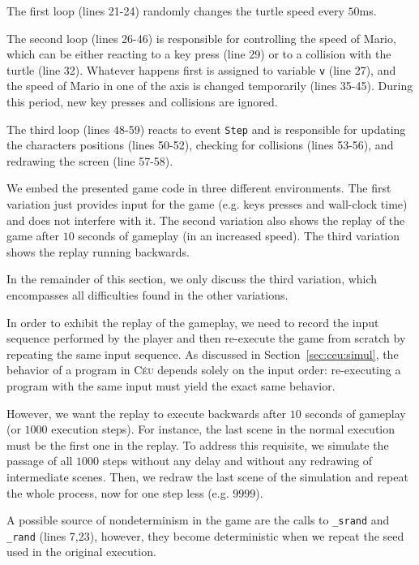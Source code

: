 \documentclass[11pt,a4paper]{article}
\newcommand{\2}{\;\;}
\newcommand{\5}{\;\;\;\;\;}
\newcommand{\CEU}{\textsc{C\'{e}u}}
\newcommand{\code}[1] {{\small{\texttt{#1}}}}
\begin{document}

The first loop (lines 21-24) randomly changes the turtle speed every $50$ms.

The second loop (lines 26-46) is responsible for controlling the speed of 
Mario, which can be either reacting to a key press (line 29) or to a collision 
with the turtle (line 32).
Whatever happens first is assigned to variable \code{v} (line 27), and the 
speed of Mario in one of the axis is changed temporarily (lines 35-45).
During this period, new key presses and collisions are ignored.

The third loop (lines 48-59) reacts to event \code{Step} and is responsible for 
updating the characters positions (lines 50-52), checking for collisions (lines 
53-56), and redrawing the screen (line 57-58).

We embed the presented game code in three different environments.
The first variation just provides input for the game (e.g. keys presses and 
wall-clock time) and does not interfere with it.
The second variation also shows the replay of the game after $10$ seconds of 
gameplay (in an increased speed).
The third variation shows the replay running backwards.

In the remainder of this section, we only discuss the third variation, which 
encompasses all difficulties found in the other variations.

In order to exhibit the replay of the gameplay, we need to record the input 
sequence performed by the player and then re-execute the game from scratch by 
repeating the same input sequence.
As discussed in Section~\ref{sec:ceu:simul}, the behavior of a program in 
\CEU{} depends solely on the input order: re-executing a program with the same 
input must yield the exact same behavior.

However, we want the replay to execute backwards after $10$ seconds of gameplay 
(or $1000$ execution steps).
For instance, the last scene in the normal execution must be the first one in 
the replay.
To address this requisite, we simulate the passage of all $1000$ steps without 
any delay and without any redrawing of intermediate scenes.
Then, we redraw the last scene of the simulation and repeat the whole process, 
now for one step less (e.g. $9999$).

A possible source of nondeterminism in the game are the calls to \code{\_srand} 
and \code{\_rand} (lines 7,23), however, they become deterministic when we 
repeat the seed used in the original execution.
\end{document}
